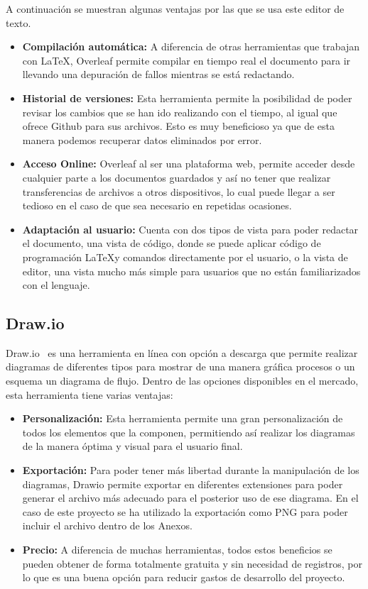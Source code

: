 A continuación se muestran algunas ventajas por las que se usa este editor de texto.
\begin{itemize}
    \item \textbf{Compilación automática: }
    A diferencia de otras herramientas que trabajan con \LaTeX, Overleaf permite compilar en tiempo real el documento para ir llevando una depuración de fallos mientras se está redactando.
    \item \textbf{Historial de versiones: } Esta herramienta permite la posibilidad de poder revisar los cambios que se han ido realizando con el tiempo, al igual que ofrece Github para sus archivos. Esto es muy beneficioso ya que de esta manera podemos recuperar datos eliminados por error.
    \item \textbf{Acceso Online: }
    Overleaf al ser una plataforma web, permite acceder desde cualquier parte a los documentos guardados y así no tener que realizar transferencias de archivos a otros dispositivos, lo cual puede llegar a ser tedioso en el caso de que sea necesario en repetidas ocasiones.
    \item \textbf{Adaptación al usuario:} Cuenta con dos tipos de vista para poder redactar el documento, una vista de código, donde se puede aplicar código de programación \LaTeX y comandos directamente por el usuario, o la vista de editor, una vista mucho más simple para usuarios que no están familiarizados con el lenguaje.
\end{itemize}

\subsection{Draw.io}
Draw.io~\cite{Drawio} es una herramienta en línea con opción a descarga que permite realizar diagramas de diferentes tipos para mostrar de una manera gráfica procesos o un esquema un diagrama de flujo.
Dentro de las opciones disponibles en el mercado, esta herramienta tiene varias ventajas:
\begin{itemize}
    \item \textbf{Personalización: }
    Esta herramienta permite una gran personalización de todos los elementos que la componen, permitiendo así realizar los diagramas de la manera óptima y visual para el usuario final.
    \item \textbf{Exportación: }
    Para poder tener más libertad durante la manipulación de los diagramas, Drawio permite exportar en diferentes extensiones para poder generar el archivo más adecuado para el posterior uso de ese diagrama. En el caso de este proyecto se ha utilizado la exportación como PNG para poder incluir el archivo dentro de los Anexos.
    \item \textbf{Precio: } A diferencia de muchas herramientas, todos estos beneficios se pueden obtener de forma totalmente gratuita y sin necesidad de registros, por lo que es una buena opción para reducir gastos de desarrollo del proyecto.
\end{itemize}

